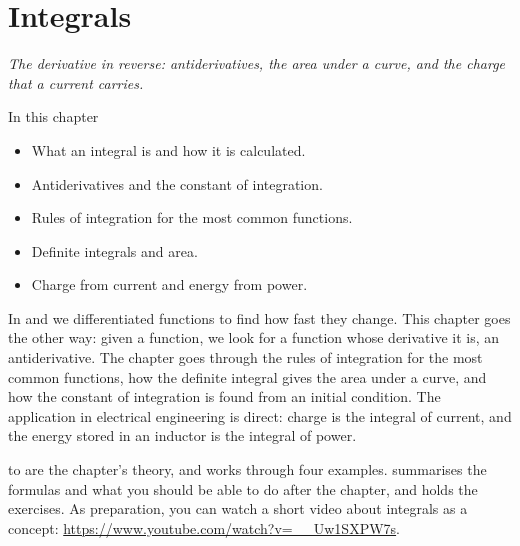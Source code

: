 
\chapter{Integrals}
\label{c14:ch}

{\large\itshape The derivative in reverse: antiderivatives, the area under a curve, and the charge
that a current carries.\par}

\begin{chapterbox}{In this chapter}
\begin{itemize}
  \item What an integral is and how it is calculated.
  \item Antiderivatives and the constant of integration.
  \item Rules of integration for the most common functions.
  \item Definite integrals and area.
  \item Charge from current and energy from power.
\end{itemize}
\end{chapterbox}

In  and  we differentiated functions to find how fast they change. This
chapter goes the other way: given a function, we look for a function whose derivative it is, an
antiderivative. The chapter goes through the rules of integration for the most common functions,
how the definite integral gives the area under a curve, and how the constant of integration is
found from an initial condition. The application in electrical engineering is direct: charge is
the integral of current, and the energy stored in an inductor is the integral of power.

 to  are the chapter's theory, and
 works through four examples. 
summarises the formulas and what you should be able to do after the chapter, and
 holds the exercises. As preparation, you can watch a short video about
integrals as a concept: \url{https://www.youtube.com/watch?v=__Uw1SXPW7s}.




